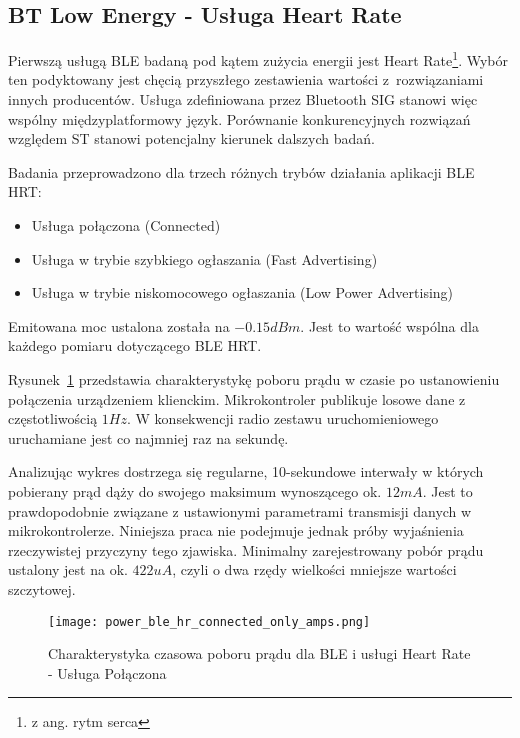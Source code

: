 \subsection{BT Low Energy - Usługa Heart Rate}

Pierwszą usługą BLE badaną pod kątem zużycia energii jest Heart Rate\footnote{z ang. rytm serca}. Wybór
ten podyktowany jest chęcią przyszłego zestawienia wartości z~rozwiązaniami innych producentów.
Usługa zdefiniowana przez Bluetooth SIG stanowi więc wspólny międzyplatformowy język.
Porównanie konkurencyjnych rozwiązań względem ST stanowi potencjalny kierunek dalszych badań.

Badania przeprowadzono dla trzech różnych trybów działania aplikacji BLE HRT:
\begin{itemize}
\item Usługa połączona (Connected)
\item Usługa w trybie szybkiego ogłaszania (Fast Advertising)
\item Usługa w trybie niskomocowego ogłaszania (Low Power Advertising)
\end{itemize}

Emitowana moc ustalona została na $-0.15dBm$. Jest to wartość wspólna dla każdego pomiaru
dotyczącego BLE HRT.

Rysunek~\ref{rys:power_ble_hr_connected_only_amps} przedstawia charakterystykę poboru prądu
w czasie po ustanowieniu połączenia urządzeniem klienckim. Mikrokontroler publikuje 
losowe dane z częstotliwością $1Hz$. W konsekwencji radio zestawu uruchomieniowego
uruchamiane jest co najmniej raz na sekundę.

Analizując wykres dostrzega się regularne, 10-sekundowe interwały w których pobierany prąd dąży do swojego
maksimum wynoszącego ok. $12mA$. Jest to prawdopodobnie związane z ustawionymi parametrami transmisji
danych w mikrokontrolerze. Niniejsza praca nie podejmuje jednak próby wyjaśnienia rzeczywistej przyczyny tego zjawiska.
Minimalny zarejestrowany pobór prądu ustalony jest na ok. $422uA$, czyli o dwa rzędy wielkości mniejsze wartości
szczytowej.


\begin{figure}[!ht]
	\centering \texttt{[image: power\_ble\_hr\_connected\_only\_amps.png]}
	\caption{Charakterystyka czasowa poboru prądu dla BLE i usługi Heart Rate - Usługa Połączona}
	\label{rys:power_ble_hr_connected_only_amps}
\end{figure}

